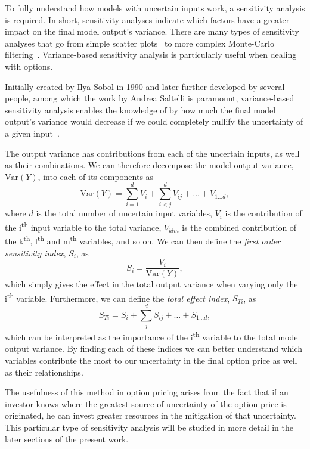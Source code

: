\documentclass[a4paper,twocolumn,aps,prd,longbibliography,superscriptaddress]{revtex4-1}
\begin{document}
To fully understand how models with uncertain inputs work, a sensitivity analysis is required. In short, sensitivity analyses indicate which factors have a greater impact on the final model output's variance.
There are many types of sensitivity analyses that go from simple scatter plots~\cite{Saltelli} to more complex Monte-Carlo filtering~\cite{Saltelli}. Variance-based sensitivity analysis is particularly useful when dealing with options.

Initially created by Ilya Sobol in 1990 and later further developed by several people, among which the work by Andrea Saltelli is paramount, variance-based sensitivity analysis enables the knowledge of by how much the final model output's variance would decrease if we could completely nullify the uncertainty of a given input~\cite{Saltelli,Sobol}.

The output variance has contributions from each of the uncertain inputs, as well as their combinations. We can therefore decompose the model output variance, $\mathrm{Var}(Y)$, into each of its components as
\begin{equation}
\mathrm{Var}(Y)=\sum_{i=1}^dV_i+\sum_{i<j}^dV_{ij}+\dots+V_{1\dots d},
\end{equation}
\noindent where $d$ is the total number of uncertain input variables, $V_{i}$ is the contribution of the i\textsuperscript{th} input variable to the total variance, $V_{klm}$ is the combined contribution of the k\textsuperscript{th}, l\textsuperscript{th} and m\textsuperscript{th} variables, and so on.
We can then define the \textit{first order sensitivity index}, $S_i$, as
\begin{equation}\label{Si}
S_i=\frac{V_i}{\mathrm{Var}(Y)},
\end{equation}
\noindent which simply gives the effect in the total output variance when varying only the i\textsuperscript{th} variable.
Furthermore, we can define the \textit{total effect index}, $S_{Ti}$, as
\begin{equation}\label{STi}
S_{Ti}=S_i+\sum_{j}^dS_{ij}+\dots+S_{1\dots d},
\end{equation}
\noindent which can be interpreted as the importance of the i\textsuperscript{th} variable to the total model output variance.
By finding each of these indices we can better understand which variables contribute the most to our uncertainty in the final option price as well as their relationships.

The usefulness of this method in option pricing arises from the fact that if an investor knows where the greatest source of uncertainty of the option price is originated, he can invest greater resources in the mitigation of that uncertainty.
This particular type of sensitivity analysis will be studied in more detail in the later sections of the present work.
\end{document}
